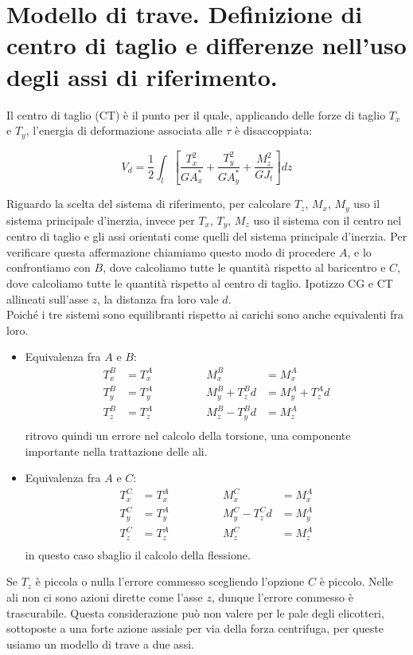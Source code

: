 \section{Modello di trave. Definizione di centro di taglio e differenze nell'uso degli assi di riferimento.}

Il centro di taglio (CT) è il punto per il quale, applicando delle forze di taglio $T_x$ e $T_y$, l'energia di deformazione associata alle $\tau$ è disaccoppiata:

\begin{equation*}
    V_{d}= \frac{1}{2} \int_l 
    \left[
        \frac{T_x^2}{G A^*_x} 
        + \frac{T_y^2}{G A^*_y} 
        + \frac{M_z^2}{G J_t}
    \right] dz
\end{equation*}

Riguardo la scelta del sistema di riferimento, per calcolare $T_z$, $M_x$, $M_y$ uso il sistema principale d'inerzia, invece per  $T_x$, $T_y$, $M_z$ uso il sistema con il centro nel centro di taglio e gli assi orientati come quelli del sistema principale d'inerzia. Per verificare questa affermazione chiamiamo questo modo di procedere $A$, e lo confrontiamo con $B$, dove calcoliamo tutte le quantità rispetto al baricentro e $C$, dove calcoliamo tutte le quantità rispetto al centro di taglio. Ipotizzo CG e CT allineati sull'asse $z$, la distanza fra loro vale $d$.\\
Poiché i tre sistemi sono equilibranti rispetto ai carichi sono anche equivalenti fra loro.
\begin{itemize}
    \item Equivalenza fra $A$ e $B$:
    \begin{align*}
        T_x^B &= T_x^A \quad\quad\quad \quad &M_x^B &= M_x^A \\
        T_y^B &= T_y^A \quad\quad\quad \quad &M_y^B + T_z^Bd &= M_y^A+T_z^Ad \\
        T_z^B &= T_z^A \quad\quad\quad \quad &M_z^B -T_y^Bd&= M_z^A \\
    \end{align*}
    ritrovo quindi un errore nel calcolo della torsione, una componente importante nella trattazione delle ali.\\
    \item Equivalenza fra $A$ e $C$:
    \begin{align*}
        T_x^C &= T_x^A \quad\quad\quad \quad &M_x^C &= M_x^A \\
        T_y^C &= T_y^A \quad\quad\quad \quad &M_y^C - T_z^Cd &= M_y^A \\
        T_z^C &= T_z^A \quad\quad\quad \quad &M_z^C &= M_z^A \\
    \end{align*}
    in questo caso sbaglio il calcolo della flessione.\\    
\end{itemize}
Se $T_z$ è piccola o nulla l'errore commesso scegliendo l'opzione $C$ è piccolo. Nelle ali non ci sono azioni dirette come l'asse $z$, dunque l'errore commesso è trascurabile. Questa considerazione può non valere per le pale degli elicotteri, sottoposte a una forte azione assiale per via della forza centrifuga, per queste usiamo un modello di trave a due assi.



